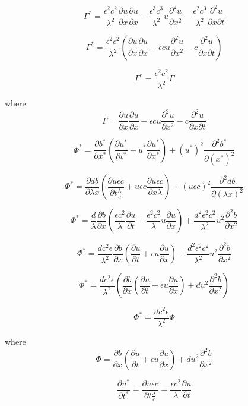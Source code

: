 \documentclass[12pt]{article}
\begin{document}
\[\Gamma^* = \frac{\epsilon^2 c^2}{\lambda^2}\frac{\partial u}{\partial x}\frac{\partial u}{\partial x} - \frac{\epsilon^3 c^3}{\lambda^2} u\frac{\partial^2 u}{\partial x^2} - \frac{\epsilon^2 c^3}{\lambda^2}\frac{\partial^2 u}{\partial x \partial t }\]

\[\Gamma^* = \frac{\epsilon^2 c^2}{\lambda^2} \left(\frac{\partial u}{\partial x}\frac{\partial u}{\partial x} - \epsilon c u\frac{\partial^2 u}{\partial x^2} -  c\frac{\partial^2 u}{\partial x \partial t } \right)\]

\[\Gamma^* = \frac{\epsilon^2 c^2}{\lambda^2} \Gamma\]

where
\[\Gamma = \frac{\partial u}{\partial x}\frac{\partial u}{\partial x} - \epsilon c u\frac{\partial^2 u}{\partial x^2} -  c\frac{\partial^2 u}{\partial x \partial t } \]

\[\Phi^* = \frac{\partial b^*}{\partial x^*}\left( \frac{\partial u^*}{\partial t^*} + u^*\frac{\partial u^*}{\partial x^*}\right) + (u^*)^2\frac{\partial^2 b^*}{\partial (x^*)^2} \]

\[\Phi^* = \frac{\partial db}{\partial \lambda x}\left( \frac{\partial u\epsilon c}{\partial t \frac{\lambda}{c}} + u\epsilon c\frac{\partial u\epsilon c}{\partial x\lambda}\right) + (u\epsilon c)^2\frac{\partial^2 db}{\partial (\lambda x)^2} \]

\[\Phi^* = \frac{d}{\lambda} \frac{\partial b}{\partial x}\left( \frac{\epsilon c^2}{\lambda}\frac{\partial u}{\partial t } + \frac{\epsilon^2 c^2}{\lambda} u\frac{\partial u}{\partial x}\right) + \frac{d^2 \epsilon^2 c^2}{\lambda^2} u^2\frac{\partial^2 b}{\partial x^2} \]

\[\Phi^* = \frac{dc^2\epsilon}{\lambda^2} \frac{\partial b}{\partial x}\left( \frac{\partial u}{\partial t } + \epsilon u\frac{\partial u}{\partial x}\right) + \frac{d^2 \epsilon^2 c^2}{\lambda^2} u^2\frac{\partial^2 b}{\partial x^2} \]

\[\Phi^* = \frac{dc^2\epsilon}{\lambda^2}\left( \frac{\partial b}{\partial x}\left( \frac{\partial u}{\partial t } + \epsilon u\frac{\partial u}{\partial x}\right) + d u^2\frac{\partial^2 b}{\partial x^2} \right) \]

\[\Phi^* = \frac{dc^2\epsilon}{\lambda^2}\Phi \]

where
\[\Phi = \frac{\partial b}{\partial x}\left( \frac{\partial u}{\partial t } + \epsilon u\frac{\partial u}{\partial x}\right) + d u^2\frac{\partial^2 b}{\partial x^2} \]

\[\frac{\partial u^*}{\partial t^*} = \frac{\partial u\epsilon c}{\partial t \frac{\lambda}{c}} = \frac{\epsilon c^2}{\lambda} \frac{\partial u}{\partial t } \]
\end{document}

